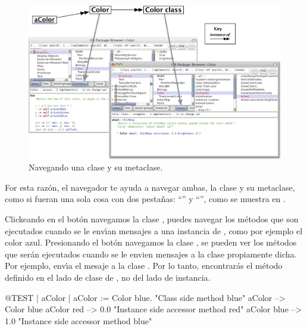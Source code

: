 \documentclass[a4paper,10pt,twoside]{book}
\begin{document}
\begin{figure}[htb]
\begin{center}
\includegraphics[width=\textwidth]{Color-Buttons}
\caption{Navegando una clase y su metaclase.
}
\end{center}
\end{figure}

For esta raz\'on, el navegador   te ayuda a navegar ambas, la clase y su metaclase, como si fueran una sola cosa con dos pesta\~nas: ``'' y ``'', como se muestra en . 

Clickeando en el bot\'on  navegamos la clase , \ie puedes navegar los m\'etodos que son ejecutados cuando se le env\'\i{}an mensajes a una instancia de , como por ejemplo el color azul. Presionando el bot\'on   navegamos la clase , \ie se pueden ver los m\'etodos que ser\'an ejecutados cuando se le envien mensajes a la clase   propiamente dicha.
Por ejemplo,  env\'\i{}a el mesaje  a la clase . Por lo tanto, encontrar\'as el m\'etodo   definido en el lado de clase de  , no del lado de instancia. 


\begin{code}{@TEST | aColor |}
aColor := Color blue.               "Class side method blue"
aColor        --> Color blue
aColor red  --> 0.0         "Instance side accessor method red"
aColor blue --> 1.0        "Instance side accessor method blue"
\end{code}
\end{document}
